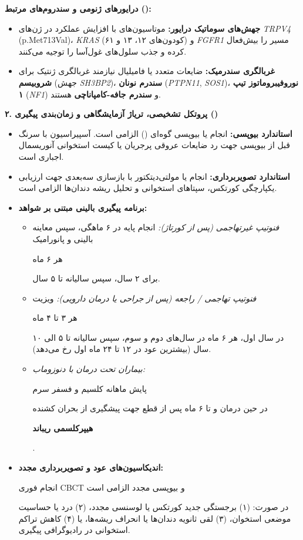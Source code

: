 \documentclass[a4paper]{article}
\newcommand{\hlg}[1]{\colorbox{hlgray}{\strut #1}}
\newcommand{\hly}[1]{\colorbox{hlyellow}{\strut #1}}
\newcommand{\hlr}[1]{\colorbox{hlred}{\strut\color{darkred}#1}}
\begin{document}
\vspace{-2pt}
\textbf{درایورهای ژنومی و سندروم‌های مرتبط ():}
\begin{itemize}
    \item \textbf{جهش‌های سوماتیک درایور:} موتاسیون‌های با افزایش عملکرد در ژن‌های \textit{TRPV4} (p.Met713Val)، \textit{KRAS} (کودون‌های ۱۲، ۱۳ و ۶۱) و \textit{FGFR1} مسیر  را بیش‌فعال کرده و جذب سلول‌های غول‌آسا را توجیه می‌کنند.
    \item \textbf{غربالگری سندرمیک:} ضایعات متعدد یا فامیلیال نیازمند غربالگری ژنتیک برای \textbf{شروبیسم} (جهش \textit{SH3BP2})، \textbf{سندرم نونان} (\textit{PTPN11}, \textit{SOS1})، \textbf{نوروفیبروماتوز تیپ ۱} (\textit{NF1}) و \textbf{سندرم جافه-کامپاناچی} هستند.
\end{itemize}

\vspace{2pt}
{\large\bfseries ۲. پروتکل تشخیصی، تریاژ آزمایشگاهی و زمان‌بندی پیگیری ()}
\vspace{1pt}

\begin{itemize}
    \item \textbf{استاندارد بیوپسی:} انجام  یا بیوپسی گوه‌ای () الزامی است. آسپیراسیون با سرنگ قبل از بیوپسی جهت رد ضایعات عروقی پرجریان یا کیست استخوانی آنوریسمال اجباری است.
    \item \textbf{استاندارد تصویربرداری:} انجام  یا  مولتی‌دیتکتور با بازسازی سه‌بعدی جهت ارزیابی یکپارچگی کورتکس، سپتاهای استخوانی و تحلیل ریشه دندان‌ها الزامی است.
    \item \textbf{برنامه پیگیری بالینی مبتنی بر شواهد:}
    \begin{itemize}
        \item \textit{فنوتیپ غیرتهاجمی (پس از کورتاژ):} انجام  پایه در ۶ ماهگی، سپس معاینه بالینی و پانورامیک \hlg{هر ۶ ماه} برای ۲ سال، سپس سالیانه تا ۵ سال.
        \item \textit{فنوتیپ تهاجمی / راجعه (پس از جراحی یا درمان دارویی):} ویزیت \hlg{هر ۳ تا ۴ ماه} در سال اول، هر ۶ ماه در سال‌های دوم و سوم، سپس سالیانه تا ۵ الی ۱۰ سال (بیشترین عود در ۱۲ تا ۲۴ ماه اول رخ می‌دهد).
        \item \textit{بیماران تحت درمان با دنوزوماب:} \hlr{پایش ماهانه کلسیم و فسفر سرم} در حین درمان و تا ۶ ماه پس از قطع جهت پیشگیری از بحران کشنده \hlr{\textbf{هیپرکلسمی ریباند}}.
    \end{itemize}
    \item \textbf{اندیکاسیون‌های عود و تصویربرداری مجدد:} \hly{انجام فوری CBCT و بیوپسی مجدد الزامی است} در صورت: (۱) برجستگی جدید کورتکس یا لوسنسی مجدد، (۲) درد یا حساسیت موضعی استخوان، (۳) لقی ثانویه دندان‌ها یا انحراف ریشه‌ها، یا (۴) کاهش تراکم استخوانی در رادیوگرافی پیگیری.
\end{itemize}
\end{document}
